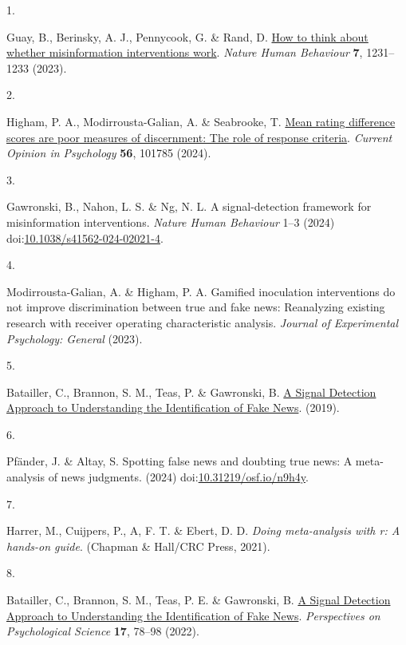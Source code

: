 \documentclass[
  man,mask,floatsintext]{apa6}
\newlength{\cslhangindent}
\newlength{\csllabelwidth}
\newenvironment{CSLReferences}[2] %
 {\begin{list}{}{%
  \setlength{\itemindent}{0pt}
  \setlength{\leftmargin}{0pt}
  \setlength{\parsep}{0pt}
  \ifodd #1
   \setlength{\leftmargin}{\cslhangindent}
   \setlength{\itemindent}{-1\cslhangindent}
  \fi
  \setlength{\itemsep}{#2\baselineskip}}}
 {\end{list}}
\newcommand{\CSLLeftMargin}[1]{\parbox[t]{\csllabelwidth}{\strut#1\strut}}
\newcommand{\CSLRightInline}[1]{\parbox[t]{\linewidth - \csllabelwidth}{\strut#1\strut}}
\begin{document}
\label{refs}
\begin{CSLReferences}{0}{0}
\CSLLeftMargin{1. }%
\CSLRightInline{Guay, B., Berinsky, A. J., Pennycook, G. \& Rand, D. \href{https://doi.org/10.1038/s41562-023-01667-w}{How to think about whether misinformation interventions work}. \emph{Nature Human Behaviour} \textbf{7}, 1231--1233 (2023).}

\CSLLeftMargin{2. }%
\CSLRightInline{Higham, P. A., Modirrousta-Galian, A. \& Seabrooke, T. \href{https://doi.org/10.1016/j.copsyc.2023.101785}{Mean rating difference scores are poor measures of discernment: The role of response criteria}. \emph{Current Opinion in Psychology} \textbf{56}, 101785 (2024).}

\CSLLeftMargin{3. }%
\CSLRightInline{Gawronski, B., Nahon, L. S. \& Ng, N. L. A signal-detection framework for misinformation interventions. \emph{Nature Human Behaviour} 1--3 (2024) doi:\href{https://doi.org/10.1038/s41562-024-02021-4}{10.1038/s41562-024-02021-4}.}

\CSLLeftMargin{4. }%
\CSLRightInline{Modirrousta-Galian, A. \& Higham, P. A. Gamified inoculation interventions do not improve discrimination between true and fake news: Reanalyzing existing research with receiver operating characteristic analysis. \emph{Journal of Experimental Psychology: General} (2023).}

\CSLLeftMargin{5. }%
\CSLRightInline{Batailler, C., Brannon, S. M., Teas, P. \& Gawronski, B. \href{https://osf.io/uc9me/}{A Signal Detection Approach to Understanding the Identification of Fake News}. (2019).}

\CSLLeftMargin{6. }%
\CSLRightInline{Pfänder, J. \& Altay, S. Spotting false news and doubting true news: A meta-analysis of news judgments. (2024) doi:\href{https://doi.org/10.31219/osf.io/n9h4y}{10.31219/osf.io/n9h4y}.}

\CSLLeftMargin{7. }%
\CSLRightInline{Harrer, M., Cuijpers, P., A, F. T. \& Ebert, D. D. \emph{Doing meta-analysis with r: A hands-on guide}. (Chapman \& Hall/CRC Press, 2021).}

\CSLLeftMargin{8. }%
\CSLRightInline{Batailler, C., Brannon, S. M., Teas, P. E. \& Gawronski, B. \href{https://doi.org/10.1177/1745691620986135}{A Signal Detection Approach to Understanding the Identification of Fake News}. \emph{Perspectives on Psychological Science} \textbf{17}, 78--98 (2022).}

\end{CSLReferences}
\end{document}
